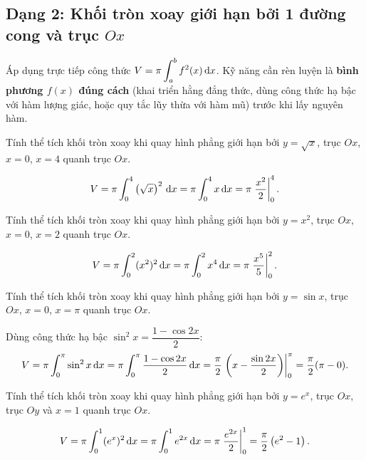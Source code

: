 \newpage
\subsection{Dạng 2: Khối tròn xoay giới hạn bởi 1 đường cong và trục \texorpdfstring{$Ox$}{Ox}}

\begin{hopphuongphap}
Áp dụng trực tiếp công thức $\displaystyle V=\pi\int_a^b f^2(x)\,\mathrm{d}x$. Kỹ năng cần rèn luyện là \textbf{bình phương $f(x)$ đúng cách} (khai triển hằng đẳng thức, dùng công thức hạ bậc với hàm lượng giác, hoặc quy tắc lũy thừa với hàm mũ) trước khi lấy nguyên hàm.
\end{hopphuongphap}

\begin{hopvidu}
Tính thể tích khối tròn xoay khi quay hình phẳng giới hạn bởi $y=\sqrt{x}$, trục $Ox$, $x=0$, $x=4$ quanh trục $Ox$.
\end{hopvidu}
\begin{loigiai}
\[
V=\pi\int_0^4 \left(\sqrt{x}\right)^2\,\mathrm{d}x = \pi\int_0^4 x\,\mathrm{d}x = \pi\left.\frac{x^2}{2}\right|_0^4.
\]
\end{loigiai}

\begin{hopvidu}
Tính thể tích khối tròn xoay khi quay hình phẳng giới hạn bởi $y=x^2$, trục $Ox$, $x=0$, $x=2$ quanh trục $Ox$.
\end{hopvidu}
\begin{loigiai}
\[
V=\pi\int_0^2 (x^2)^2\,\mathrm{d}x = \pi\int_0^2 x^4\,\mathrm{d}x = \pi\left.\frac{x^5}{5}\right|_0^2.
\]
\end{loigiai}

\begin{hopvidu}
Tính thể tích khối tròn xoay khi quay hình phẳng giới hạn bởi $y=\sin x$, trục $Ox$, $x=0$, $x=\pi$ quanh trục $Ox$.
\end{hopvidu}
\begin{loigiai}
Dùng công thức hạ bậc $\sin^2x = \dfrac{1-\cos2x}{2}$:
\[
V=\pi\int_0^\pi \sin^2x\,\mathrm{d}x = \pi\int_0^\pi \frac{1-\cos2x}{2}\,\mathrm{d}x = \frac{\pi}{2}\left.\left(x-\frac{\sin2x}{2}\right)\right|_0^\pi = \frac{\pi}{2}(\pi-0).
\]
\end{loigiai}

\begin{hopvidu}[(Hàm mũ)]
Tính thể tích khối tròn xoay khi quay hình phẳng giới hạn bởi $y=e^x$, trục $Ox$, trục $Oy$ và $x=1$ quanh trục $Ox$.
\end{hopvidu}
\begin{loigiai}
\[
V=\pi\int_0^1 (e^x)^2\,\mathrm{d}x = \pi\int_0^1 e^{2x}\,\mathrm{d}x = \pi\left.\frac{e^{2x}}{2}\right|_0^1 = \frac{\pi}{2}\left(e^2-1\right).
\]
\end{loigiai}

